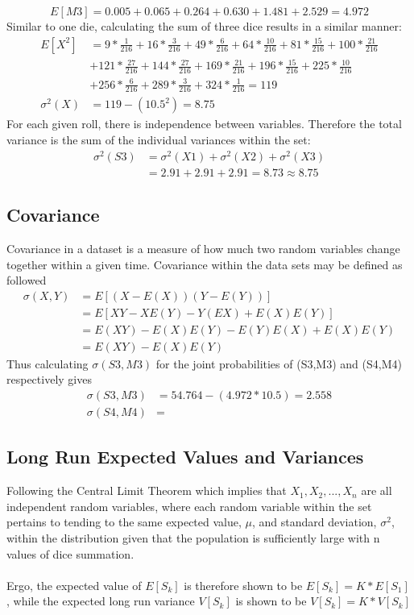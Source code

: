 \documentclass[12pt]{article}
\begin{document}
$$E[M3]=0.005+0.065+0.264+0.630+1.481+2.529=4.972$$
Similar to one die, calculating the sum of three dice results in a similar manner:
\begin{align*}
E[X^2]&=9*\frac{1}{216}+16*\frac{3}{216}+49*\frac{6}{216}+64*\frac{10}{216}+81*\frac{15}{216}+100*\frac{21}{216}\\&+121*\frac{27}{216}+144*\frac{27}{216}+169*\frac{21}{216}+196*\frac{15}{216}+225*\frac{10}{216}\\&+256*\frac{6}{216}+289*\frac{3}{216}+324*\frac{1}{216} = 119\\
\sigma^2(X)&=119-(10.5^2)=8.75
\end{align*}
For each given roll, there is independence between variables. Therefore the total variance is the sum of the individual variances within the set:
\begin{align*}
\sigma^2(S3)&=\sigma^2(X1)+\sigma^2(X2)+\sigma^2(X3)\\
&=2.91+2.91+2.91=8.73\approx8.75
\end{align*}
\subsection{Covariance}
Covariance in a dataset is a measure of how much two random variables change together within a given time. Covariance within the data sets may be defined as followed
\begin{align*}
\sigma(X,Y)&=E[(X-E(X))(Y-E(Y))]\\
&=E[XY-XE(Y)-Y(EX)+E(X)E(Y)]\\
&=E(XY)-E(X)E(Y)-E(Y)E(X)+E(X)E(Y)\\
&=E(XY)-E(X)E(Y)
\end{align*}
Thus calculating $\sigma(S3,M3)$ for the joint probabilities of (S3,M3) and (S4,M4) respectively gives
\begin{align*}
\sigma(S3,M3)&=54.764-(4.972*10.5)=2.558\\
\sigma(S4,M4)&=
\end{align*}

\subsection{Long Run Expected Values and Variances}
Following the Central Limit Theorem which implies that $X_1,X_2,...,X_n$ are all independent random variables, where each random variable within the set pertains to tending to the same expected value, $\mu$, and standard deviation, $\sigma^2$, within the distribution given that the population is sufficiently large with n values of dice summation.
\\
\\
Ergo, the expected value of $E[S_k]$ is therefore shown to be $E[S_k]=K*E[S_1]$, while the expected long run variance $V[S_k]$ is shown to be $V[S_k]=K*V[S_k]$
\end{document}
